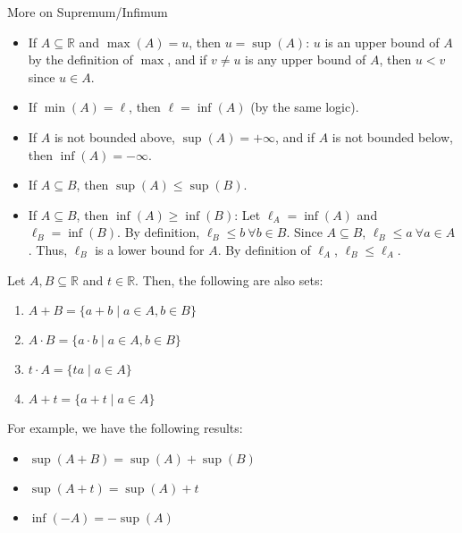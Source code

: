 \documentclass[8pt]{extarticle}
\newcommand{\R}{\mathbb{R}}
\begin{document}
  \begin{problem}{More on Supremum/Infimum}
    \begin{itemize}
      \item If $A \subseteq \R$ and $\max(A) = u$, then $u = \sup(A)$: $u$ is an upper bound of $A$ by the definition of $\max$, and if $v\neq u$ is any upper bound of $A$, then $u < v$ since $u\in A$.
      \item If $\min(A) = \ell$, then $\ell = \inf(A)$ (by the same logic).
      \item If $A$ is not bounded above, $\sup(A) = +\infty$, and if $A$ is not bounded below, then $\inf(A) = -\infty$.
      \item If $A\subseteq B$, then $\sup(A) \leq \sup(B)$.
      \item If $A\subseteq B$, then $\inf(A) \geq \inf(B)$: Let $\ell_A = \inf(A)$ and $\ell_B = \inf(B)$. By definition, $\ell_B \leq b~\forall b\in B$. Since $A\subseteq B$, $\ell_B \leq a~\forall a\in A$. Thus, $\ell_B$ is a lower bound for $A$. By definition of $\ell_A$, $\ell_B \leq \ell_A$.
    \end{itemize}
    Let $A,B\subseteq \R$ and $t\in\R$. Then, the following are also sets:
    \begin{enumerate}[(1)]
      \item $A + B = \{a+b\mid a\in A,b\in B\}$
      \item $A\cdot B = \{a\cdot b\mid a\in A,b\in B\}$
      \item $t\cdot A = \{ta\mid a\in A\}$
      \item $A + t = \{a+t\mid a\in A\}$
    \end{enumerate}
    For example, we have the following results:
    \begin{itemize}
      \item $\sup(A+B) = \sup(A) + \sup(B)$
      \item $\sup(A+t) = \sup(A) + t$
      \item $\inf(-A) = -\sup(A)$
    \end{itemize}
  \end{problem}
\end{document}
